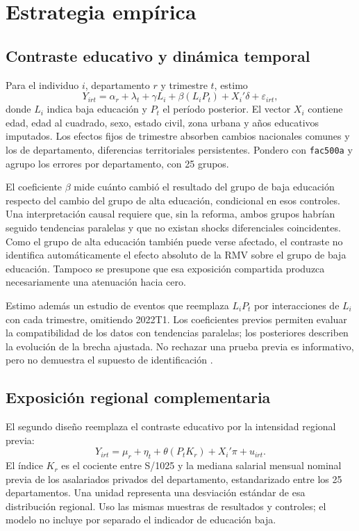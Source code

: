 \section{Estrategia empírica}

\subsection{Contraste educativo y dinámica temporal}

Para el individuo $i$, departamento $r$ y trimestre $t$, estimo
\begin{equation}
Y_{irt}=\alpha_r+\lambda_t+\gamma L_i+\beta(L_iP_t)+X_i'\delta+\varepsilon_{irt},
\label{eq:short_did}
\end{equation}
donde $L_i$ indica baja educación y $P_t$ el período posterior. El vector $X_i$ contiene edad, edad al cuadrado, sexo, estado civil, zona urbana y años educativos imputados. Los efectos fijos de trimestre absorben cambios nacionales comunes y los de departamento, diferencias territoriales persistentes. Pondero con \texttt{fac500a} y agrupo los errores por departamento, con 25 grupos.

El coeficiente $\beta$ mide cuánto cambió el resultado del grupo de baja educación respecto del cambio del grupo de alta educación, condicional en esos controles. Una interpretación causal requiere que, sin la reforma, ambos grupos habrían seguido tendencias paralelas y que no existan shocks diferenciales coincidentes. Como el grupo de alta educación también puede verse afectado, el contraste no identifica automáticamente el efecto absoluto de la RMV sobre el grupo de baja educación. Tampoco se presupone que esa exposición compartida produzca necesariamente una atenuación hacia cero.

Estimo además un estudio de eventos que reemplaza $L_iP_t$ por interacciones de $L_i$ con cada trimestre, omitiendo 2022T1. Los coeficientes previos permiten evaluar la compatibilidad de los datos con tendencias paralelas; los posteriores describen la evolución de la brecha ajustada. No rechazar una prueba previa es informativo, pero no demuestra el supuesto de identificación \citep{roth_2022_pretest}.

\subsection{Exposición regional complementaria}

El segundo diseño reemplaza el contraste educativo por la intensidad regional previa:
\begin{equation}
Y_{irt}=\mu_r+\eta_t+\theta(P_tK_r)+X_i'\pi+u_{irt}.
\label{eq:short_regional}
\end{equation}
El índice $K_r$ es el cociente entre S/1025 y la mediana salarial mensual nominal previa de los asalariados privados del departamento, estandarizado entre los 25 departamentos. Una unidad representa una desviación estándar de esa distribución regional. Uso las mismas muestras de resultados y controles; el modelo no incluye por separado el indicador de educación baja.

